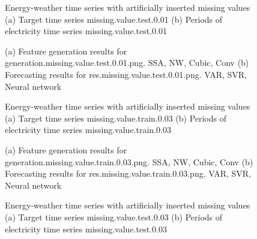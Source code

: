 \documentclass[12pt]{article}
\begin{document}
\begin{figure}
\centering
{}
\caption{Energy-weather time series with artificially inserted missing values	(a) Target time series	missing.value.test.0.01	(b) Periods of electricity time series	missing.value.test.0.01	}
\end{figure}


\begin{figure}
\centering
{}
\caption{(a)	Feature generation results for	generation.missing.value.test.0.01.png.	SSA, NW, Cubic, Conv	(b)	Forecasting results for	res.missing.value.test.0.01.png.	VAR, SVR, Neural network	}
\end{figure}


\begin{figure}
\centering
{}
\caption{Energy-weather time series with artificially inserted missing values	(a) Target time series	missing.value.train.0.03	(b) Periods of electricity time series	missing.value.train.0.03	}
\end{figure}


\begin{figure}
\centering
{}
\caption{(a)	Feature generation results for	generation.missing.value.train.0.03.png.	SSA, NW, Cubic, Conv	(b)	Forecasting results for	res.missing.value.train.0.03.png.	VAR, SVR, Neural network	}
\end{figure}


\begin{figure}
\centering
{}
\caption{Energy-weather time series with artificially inserted missing values	(a) Target time series	missing.value.test.0.03	(b) Periods of electricity time series	missing.value.test.0.03	}
\end{figure}
\end{document}
